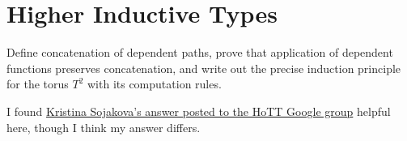 \begin{coqdoccode}
\end{coqdoccode}
\section{Higher Inductive Types}



Define concatenation of dependent paths, prove that application of dependent
functions preserves concatenation, and write out the precise induction
principle for the torus $T^{2}$ with its computation rules.


 \soln
I found
\href{http://ncatlab.org/homotopytypetheory/files/torus.pdf}{Kristina
Sojakova's answer posted to the HoTT Google group}
helpful here, though I think my answer differs.


